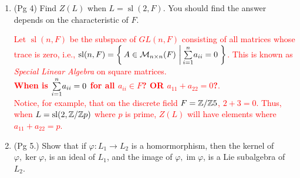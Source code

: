 \documentclass[12pt,a4paper]{report}
\newcommand{\RED}[1]{\textcolor{red}{#1}}
\newcommand{\SL}{\operatorname{sl}}
\newcommand{\IMG}{\operatorname{im}}
\begin{document}
\begin{enumerate}[label=\textit{1.\arabic*}]
\item (Pg 4) Find $Z(L)$ when $L=\SL(2,F)$.  You should find the answer depends on the characteristic of $F$.

\RED{Let $\SL(n,F)$ be the subspace of $GL(n,F)$ consisting of all matrices whose trace is zero, i.e., $\SL(n,F) = \BRACKET{A \in \mathcal{M}_{n\times n}(F)\,\LBAR{ \SUM{i=1}{n} a_{ii} = 0}}$.  This is known as \textit{Special Linear Algebra} on square matrices.\\
\textbf{When is $\underset{i=1}{\overset{n}{\sum}} a_{ii} = 0$ for all $a_{ii} \in F$? OR $a_{11}+a_{22}=0$?}. \\
Notice, for example, that on the discrete field $
F=\mathbb{Z}/\mathbb{Z}5$, $2+3=0$. Thus, when $L=\SL(2,\Z/\Z p)$ where $p$ is prime, $Z(L)$ will have elements where $a_{11}+a_{22} = p$.  
}

\item (Pg 5.) Show that if $\varphi : L_1\to L_2$ is a homormorphism, then the kernel of $\varphi, \ker \varphi$, is an ideal of $L_1$, and the image of $\varphi, \IMG \varphi$, is a Lie subalgebra of $L_2$.


\end{enumerate}
\end{document}
